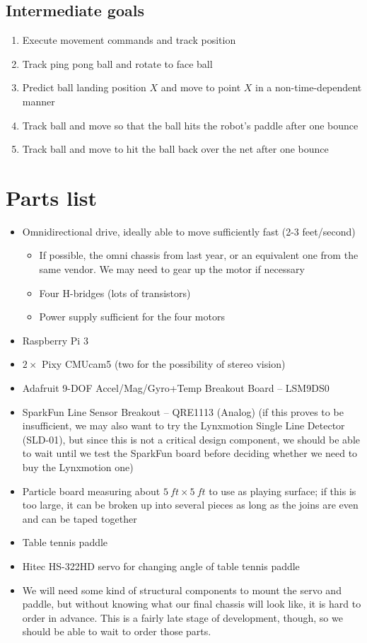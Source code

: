 \documentclass[letterpaper, 11pt]{article}
\begin{document}
\subsection*{Intermediate goals}
\begin{enumerate}
    \item Execute movement commands and track position
    \item Track ping pong ball and rotate to face ball
    \item Predict ball landing position $X$ and move to point $X$ in a non-time-dependent manner
    \item Track ball and move so that the ball hits the robot's paddle after one bounce
    \item Track ball and move to hit the ball back over the net after one bounce
\end{enumerate}

\clearpage
\section{Parts list}
\begin{itemize}
    \item Omnidirectional drive, ideally able to move sufficiently fast (2-3 feet/second)
        \begin{itemize}
            \item If possible, the omni chassis from last year, or an equivalent one from the same vendor. We may need to gear up the motor if necessary
            \item Four H-bridges (lots of transistors)
            \item Power supply sufficient for the four motors
        \end{itemize}
    \item Raspberry Pi 3
    \item $2\times{}$ Pixy CMUcam5 (two for the possibility of stereo vision)
    \item Adafruit 9-DOF Accel/Mag/Gyro+Temp Breakout Board -- LSM9DS0
    \item SparkFun Line Sensor Breakout -- QRE1113 (Analog) (if this proves to be insufficient, we may also want to try the Lynxmotion Single Line Detector (SLD-01), but since this is not a critical design component, we should be able to wait until we test the SparkFun board before deciding whether we need to buy the Lynxmotion one)
    \item Particle board measuring about $\SI{5}{ft}\times\SI{5}{ft}$ to use as playing surface; if this is too large, it can be broken up into several pieces as long as the joins are even and can be taped together
    \item Table tennis paddle
    \item Hitec HS-322HD servo for changing angle of table tennis paddle
    \item We will need some kind of structural components to mount the servo and paddle, but without knowing what our final chassis will look like, it is hard to order in advance. This is a fairly late stage of development, though, so we should be able to wait to order those parts.
\end{itemize}
\end{document}
